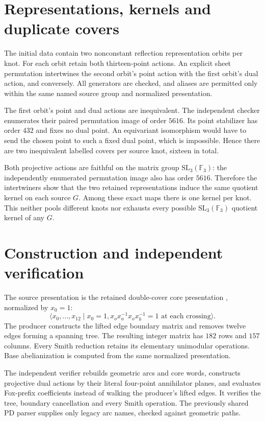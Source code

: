 \documentclass[11pt]{article}
\newcommand{\F}{\mathbb F}
\begin{document}
\section{Representations, kernels and duplicate covers}

The initial data contain two nonconstant reflection
representation orbits per knot. For each orbit retain both
thirteen-point actions. An explicit sheet permutation
intertwines the second orbit's point action with the first
orbit's dual action, and conversely. All generators are
checked, and aliases are permitted only within the same
named source group and normalized presentation.

The first orbit's point and dual actions are inequivalent.
The independent checker enumerates their paired permutation
image of order $5616$. Its point stabilizer has order $432$
and fixes no dual point. An equivariant isomorphism would
have to send the chosen point to such a fixed dual point,
which is impossible. Hence there are two inequivalent
labelled covers per source knot, sixteen in total.

Both projective actions are faithful on the matrix group
$\mathrm{SL}_3(\F_3)$: the independently enumerated permutation
image also has order $5616$. Therefore the intertwiners show
that the two retained representations induce the same
quotient kernel on each source $G$. Among these exact maps
there is one kernel per knot. This neither pools different
knots nor exhausts every possible $\mathrm{SL}_3(\F_3)$
quotient kernel of any $G$.

\section{Construction and independent verification}

The source presentation is the retained double-cover core
presentation \cite{core}, normalized by $x_0=1$:
\[
 \langle x_0,\ldots,x_{12}\mid x_0=1,
   x_ox_a^{-1}x_ox_b^{-1}=1\text{ at each crossing}\rangle.
\]
The producer constructs the lifted edge boundary matrix and
removes twelve edges forming a spanning tree. The resulting
integer matrix has $182$ rows and $157$ columns. Every Smith
reduction retains its elementary unimodular operations.
Base abelianization is computed from the same normalized
presentation.

The independent verifier rebuilds geometric arcs and core
words, constructs projective dual actions by their literal
four-point annihilator planes, and evaluates Fox-prefix
coefficients instead of walking the producer's lifted edges.
It verifies the tree, boundary cancellation and every Smith
operation. The previously shared PD parser supplies only
legacy arc names, checked against geometric paths.
\end{document}
